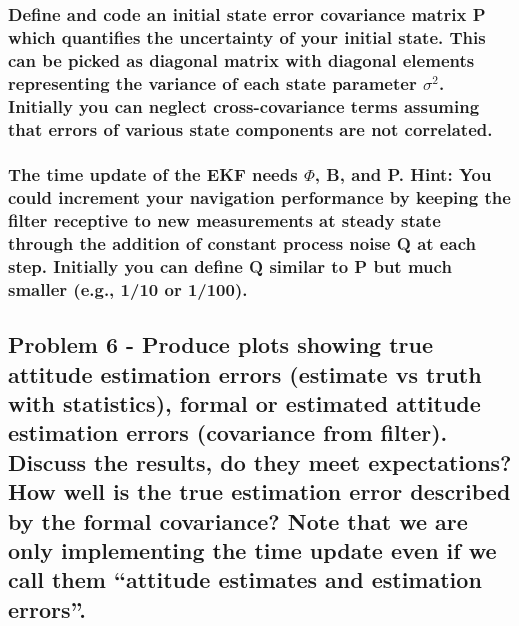 \subsubsection{Define and code an initial state error covariance matrix P which quantifies the uncertainty of your initial state. This can be picked as diagonal matrix with diagonal elements representing the variance of each state parameter $\sigma ^2$. Initially you can neglect cross-covariance terms assuming that errors of various state components are not correlated.}

\subsubsection{The time update of the EKF needs $\Phi$, B, and P. Hint: You could increment your navigation performance by keeping the filter receptive to new measurements at steady state through the addition of constant process noise Q at each step. Initially you can define Q similar to P but much smaller (e.g., 1/10 or 1/100).}

\subsection{Problem 6 - Produce plots showing true attitude estimation errors (estimate vs truth with statistics), formal or estimated attitude estimation errors (covariance from filter). Discuss the results, do they meet expectations? How well is the true estimation error described by the formal covariance? Note that we are only implementing the time update even if we call them “attitude estimates and estimation errors”.}